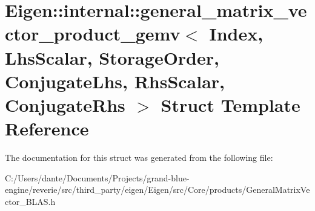 \hypertarget{struct_eigen_1_1internal_1_1general__matrix__vector__product__gemv}{}\section{Eigen\+::internal\+::general\+\_\+matrix\+\_\+vector\+\_\+product\+\_\+gemv$<$ Index, Lhs\+Scalar, Storage\+Order, Conjugate\+Lhs, Rhs\+Scalar, Conjugate\+Rhs $>$ Struct Template Reference}
\label{struct_eigen_1_1internal_1_1general__matrix__vector__product__gemv}


The documentation for this struct was generated from the following file\+:\begin{DoxyCompactItemize}
\item 
C\+:/\+Users/dante/\+Documents/\+Projects/grand-\/blue-\/engine/reverie/src/third\+\_\+party/eigen/\+Eigen/src/\+Core/products/General\+Matrix\+Vector\+\_\+\+B\+L\+A\+S.\+h\end{DoxyCompactItemize}
